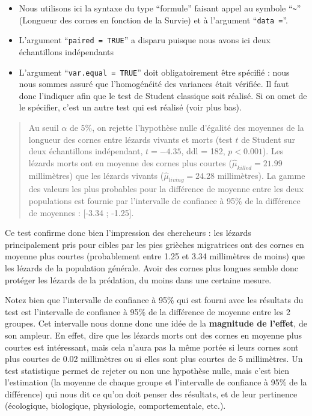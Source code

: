 \documentclass[
  french,
  a4paper,
  DIV=11,
  numbers=noendperiod,
  oneside]{scrreprt}
\providecommand{\tightlist}{%
  \setlength{\itemsep}{0pt}\setlength{\parskip}{0pt}}
\begin{document}
\begin{itemize}
\tightlist
\item
  Nous utilisons ici la syntaxe du type ``formule'' faisant appel au
  symbole ``\texttt{\textasciitilde{}}'' (Longueur des cornes en
  fonction de la Survie) et à l'argument ``\texttt{data\ =}''.
\item
  L'argument ``\texttt{paired\ =\ TRUE}'' a disparu puisque nous avons
  ici deux échantillons indépendants
\item
  L'argument ``\texttt{var.equal\ =\ TRUE}'' doit obligatoirement être
  spécifié : nous nous sommes assuré que l'homogénéité des variances
  était vérifiée. Il faut donc l'indiquer afin que le test de Student
  classique soit réalisé. Si on omet de le spécifier, c'est un autre
  test qui est réalisé (voir plus bas).
\end{itemize}

\begin{quote}
Au seuil \(\alpha\) de 5\%, on rejette l'hypothèse nulle d'égalité des
moyennes de la longueur des cornes entre lézards vivants et morts (test
\(t\) de Student sur deux échantillons indépendant, \(t = -4.35\), ddl =
182, \(p < 0.001\)). Les lézards morts ont en moyenne des cornes plus
courtes (\(\hat{\mu}_{killed} = 21.99\) millimètres) que les lézards
vivants (\(\hat{\mu}_{living} = 24.28\) millimètres). La gamme des
valeurs les plus probables pour la différence de moyenne entre les deux
populations est fournie par l'intervalle de confiance à 95\% de la
différence de moyennes : {[}-3.34 ; -1.25{]}.
\end{quote}

Ce test confirme donc bien l'impression des chercheurs : les lézards
principalement pris pour cibles par les pies grièches migratrices ont
des cornes en moyenne plus courtes (probablement entre 1.25 et 3.34
millimètres de moins) que les lézards de la population générale. Avoir
des cornes plus longues semble donc protéger les lézards de la
prédation, du moins dans une certaine mesure.

Notez bien que l'intervalle de confiance à 95\% qui est fourni avec les
résultats du test est l'intervalle de confiance à 95\% de la différence
de moyenne entre les 2 groupes. Cet intervalle nous donne donc une idée
de la \textbf{magnitude de l'effet}, de son ampleur. En effet, dire que
les lézards morts ont des cornes en moyenne plus courtes est
intéressant, mais cela n'aura pas la même portée si leurs cornes sont
plus courtes de 0.02 millimètres ou si elles sont plus courtes de 5
millimètres. Un test statistique permet de rejeter ou non une hypothèse
nulle, mais c'est bien l'estimation (la moyenne de chaque groupe et
l'intervalle de confiance à 95\% de la différence) qui nous dit ce qu'on
doit penser des résultats, et de leur pertinence (écologique,
biologique, physiologie, comportementale, etc.).
\end{document}
